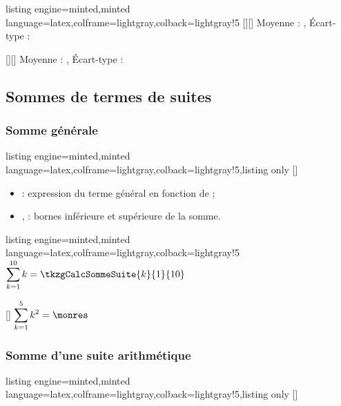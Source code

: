 \documentclass[11pt,a4paper]{ltxdoc}
\begin{document}
\begin{tcblisting}{listing engine=minted,minted language=latex,colframe=lightgray,colback=lightgray!5}
[\mamoy][\monect]
Moyenne : \mamoy, Écart-type : \monect

[\mamoy][\monect]
Moyenne : \mamoy, Écart-type : \monect
\end{tcblisting}

\subsection{Sommes de termes de suites}

\subsubsection{Somme générale}

\begin{tcblisting}{listing engine=minted,minted language=latex,colframe=lightgray,colback=lightgray!5,listing only}
[\macro]
\end{tcblisting}

\begin{itemize}
  \item {} : expression du terme général en fonction de  ;
  \item {},  : bornes inférieure et supérieure de la somme.
\end{itemize}

\begin{tcblisting}{listing engine=minted,minted language=latex,colframe=lightgray,colback=lightgray!5}
$\displaystyle\sum_{k=1}^{10} k = \tkzgCalcSommeSuite{k}{1}{10}$

[\monres]
$\displaystyle\sum_{k=1}^{5} k^2 = \monres$
\end{tcblisting}

\subsubsection{Somme d'une suite arithmétique}

\begin{tcblisting}{listing engine=minted,minted language=latex,colframe=lightgray,colback=lightgray!5,listing only}
[\macro]
\end{tcblisting}
\end{document}
